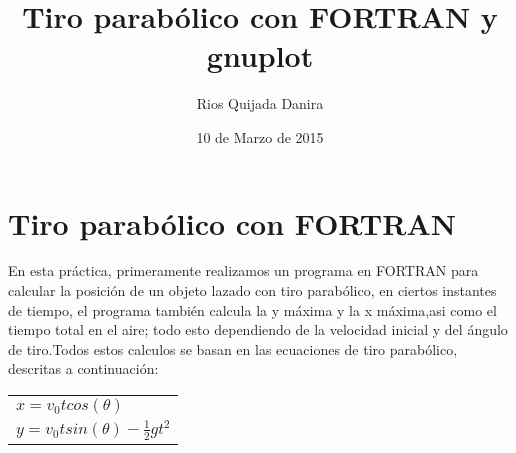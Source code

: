 \documentclass[10pt]{article}
\title{Tiro parabólico con FORTRAN y gnuplot}
\author{Rios Quijada Danira}
\date{10 de Marzo de 2015}
\begin{document}
\maketitle
\section{Tiro parabólico con FORTRAN}
En esta práctica, primeramente realizamos un programa en FORTRAN para calcular la posición de un objeto lazado con tiro parabólico, en ciertos instantes de tiempo, el programa también calcula la y máxima y la x máxima,asi como el tiempo total en el aire; todo esto dependiendo de la velocidad inicial y del ángulo de tiro.Todos estos calculos se basan en las ecuaciones de tiro parabólico, descritas a continuación:
\space
\space
\begin{tabular}{l}
$x=v_{0}tcos(\theta)$\\
$y=v_{0}tsin(\theta)- \frac{1}{2}gt^2$
\end{tabular}
\end{document}
